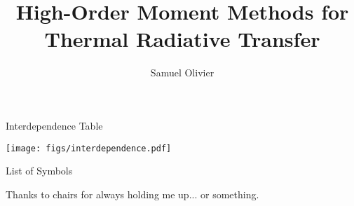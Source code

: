 \documentclass[todo]{dissertation}
\begin{document}
\title{High-Order Moment Methods for Thermal Radiative Transfer}
\author{Samuel Olivier}
\maketitle

\copyrightpage



\begin{frontmatter}

\begin{KeepFromToc}
\tableofcontents
\end{KeepFromToc}
\clearpage

\begin{preamble}{Interdependence Table}
\vfill
\begin{center}
\label{preamble:interdependence}
\texttt{[image: figs/interdependence.pdf]}
\end{center}
\end{preamble}

\printglossary[style=april_gloss_style]
\clearpage

\begin{preamble}{List of Symbols}

\end{preamble}


\begin{preamble}{\acknowledgename}
Thanks to chairs for always holding me up... or something. 
\end{preamble}
\end{frontmatter}

\glsresetall %
\pagestyle{headings}










\glsresetall %

\clearpage
\printbibliography
\appendix 

\end{document}

